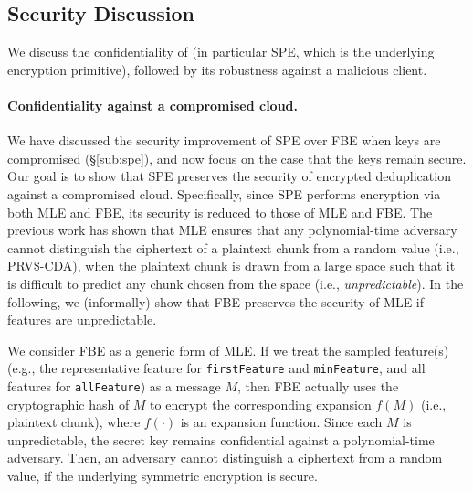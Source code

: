 

\subsection{Security Discussion}
\label{sub:security}

We discuss the confidentiality of \sysnameF (in particular SPE, which is the underlying encryption primitive), followed by its robustness against a malicious client.

\paragraph{Confidentiality against a compromised cloud.}
We have discussed the security improvement of SPE over FBE when keys are compromised (\S\ref{sub:spe}), and now
focus on the case that the keys remain secure. Our goal is to show that SPE preserves the security of encrypted deduplication against a compromised cloud. Specifically,
since SPE performs encryption via both MLE and FBE, its security is reduced to those of MLE and FBE. The previous work \cite{bellare13a} has shown
that MLE ensures that any  polynomial-time adversary cannot distinguish the ciphertext of a plaintext chunk from a random value (i.e., PRV\$-CDA), when the plaintext chunk is
drawn from a large space such that it is difficult to predict any chunk chosen from the space (i.e., {\em unpredictable}). In the following, we (informally) show that FBE preserves the security  of MLE if features are unpredictable.


We consider FBE as a generic form of MLE. If we treat the sampled feature(s) (e.g., the representative feature for {\tt firstFeature} and {\tt minFeature}, and all features for {\tt allFeature}) as a message $M$, then FBE actually uses the cryptographic hash of $M$ to encrypt the corresponding expansion $f(M)$ (i.e., plaintext chunk), where $f(\cdot)$ is an expansion function. Since each $M$ is unpredictable, the secret key  remains confidential against a polynomial-time adversary. Then, an adversary cannot distinguish a ciphertext from a random value, if the underlying symmetric encryption is secure.

